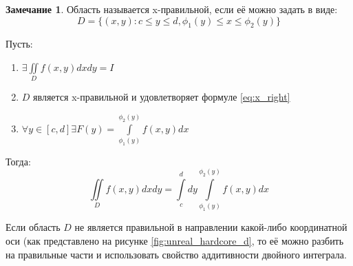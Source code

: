 \documentclass[a4paper, 14pt]{report}
\theoremstyle{definition}
\newtheorem*{note}{Замечание}
\begin{document}
		\begin{note}
			Область называется x-правильной, если её можно задать в виде:
			\begin{equation}
				\label{eq:x_right}
				D=\{(x,y):c\le y\le d,\phi_1(y)\le x\le \phi_2(y)\}
			\end{equation}
			
			Пусть:
			\begin{enumerate}
				\item $\exists\iint\limits_D f(x, y)dxdy=I$
				\item $D$ является x-правильной и удовлетворяет формуле \ref{eq:x_right}
				\item $\forall y\in[c,d]\exists F(y)=\int\limits_{\phi_1(y)}^{\phi_2(y)}f(x,y)dx$
			\end{enumerate}
		
			Тогда:
			\begin{equation}
				\iint\limits_Df(x,y)dxdy=\int\limits_c^ddy\int\limits_{\phi_1(y)}^{\phi_2(y)}f(x,y)dx
			\end{equation}
		\end{note}
	
		Если область $D$ не является правильной в направлении какой-либо координатной оси (как представлено на рисунке \ref{fig:unreal_hardcore_d}, то её можно разбить на правильные части и использовать свойство аддитивности двойного интеграла.
		
\end{document}
